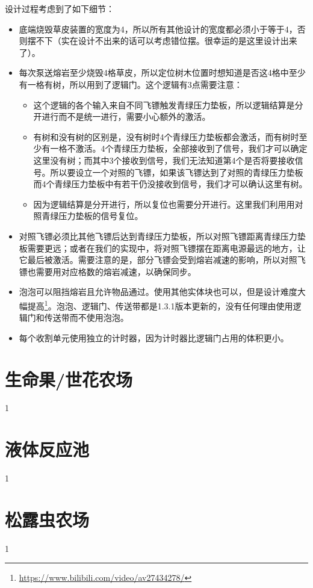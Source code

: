 设计过程考虑到了如下细节：

\begin{itemize}
\item 底端烧毁草皮装置的宽度为4，所以所有其他设计的宽度都必须小于等于4，否则摆不下（实在设计不出来的话可以考虑错位摆。很幸运的是这里设计出来了）。
\item 每次泵送熔岩至少烧毁4格草皮，所以定位树木位置时想知道是否这4格中至少有一格有树，所以用到了逻辑门。这个逻辑有3点需要注意：
	\begin{itemize}
	\item 这个逻辑的各个输入来自不同飞镖触发青绿压力垫板，所以逻辑结算是分开进行而不是统一进行，需要小心额外的激活。
	\item 有树和没有树的区别是，没有树时4个青绿压力垫板都会激活，而有树时至少有一格不激活。4个青绿压力垫板，全部接收到了信号，我们才可以确定这里没有树；而其中3个接收到信号，我们无法知道第4个是否将要接收信号。所以要设立一个对照的飞镖，如果该飞镖达到了对照的青绿压力垫板而4个青绿压力垫板中有若干仍没接收到信号，我们才可以确认这里有树。
	\item 因为逻辑结算是分开进行，所以复位也需要分开进行。这里我们利用用对照青绿压力垫板的信号复位。
	\end{itemize}
\item 对照飞镖必须比其他飞镖后达到青绿压力垫板，所以对照飞镖距离青绿压力垫板需要更远；或者在我们的实现中，将对照飞镖摆在距离电源最远的地方，让它最后被激活。需要注意的是，部分飞镖会受到熔岩减速的影响，所以对照飞镖也需要用对应格数的熔岩减速，以确保同步。
\item 泡泡可以阻挡熔岩且允许物品通过。使用其他实体块也可以，但是设计难度大幅提高\footnote{\url{https://www.bilibili.com/video/av27434278/}}。泡泡、逻辑门、传送带都是1.3.1版本更新的，没有任何理由使用逻辑门和传送带而不使用泡泡。
\item 每个收割单元使用独立的计时器，因为计时器比逻辑门占用的体积更小。
\end{itemize}

\section{生命果/世花农场}
1

\section{液体反应池}
1

\section{松露虫农场}
1


